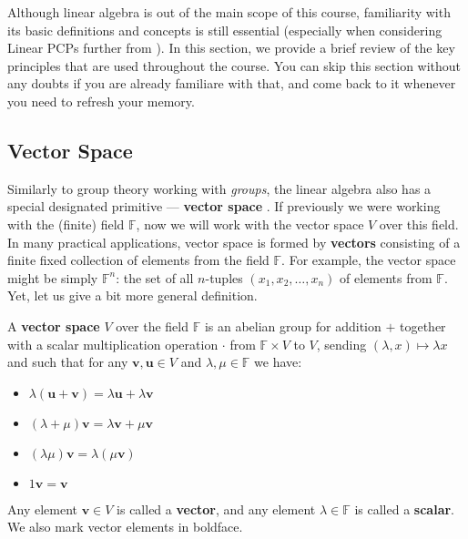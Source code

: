 \documentclass[../lecture-notes-148x210.tex]{subfiles}
\begin{document}
Although linear algebra is out of the main scope of this course, familiarity
with its basic definitions and concepts is still essential (especially when
considering Linear PCPs further from ). In this section, we
provide a brief review of the key principles that are used throughout the
course. You can skip this section without any doubts if you are already
familiare with that, and come back to it whenever you need to refresh your
memory.

\subsection{Vector Space}

Similarly to group theory working with \textit{groups}, the linear algebra also has a special designated primitive --- \textbf{vector space} \cite[section 20]{Judson_2012}. If previously we were working
with the (finite) field $\mathbb{F}$, now we will work with the vector space $V$ over this field. In many practical applications,
vector space is formed by \textbf{vectors} consisting of a finite fixed collection of elements from the field $\mathbb{F}$. For example,
the vector space might be simply $\mathbb{F}^n$: the set of all $n$-tuples $(x_1,x_2,\dots,x_n)$ of elements from $\mathbb{F}$. Yet, let us give a bit more general definition.

\begin{definition}
    A \textbf{vector space} $V$ over the field $\mathbb{F}$ is an abelian group for addition $+$ together with a scalar multiplication operation $\cdot$ from $\mathbb{F} \times V$ to $V$, sending $(\lambda,x) \mapsto \lambda x$ and such that for any $\mathbf{v},\mathbf{u} \in V$ and $\lambda,\mu \in \mathbb{F}$ we have:
    \begin{itemize}
        \item $\lambda(\mathbf{u}+\mathbf{v}) = \lambda \mathbf{u} + \lambda \mathbf{v}$
        \item $(\lambda + \mu)\mathbf{v} = \lambda \mathbf{v} + \mu \mathbf{v}$
        \item $(\lambda \mu)\mathbf{v} = \lambda(\mu \mathbf{v})$
        \item $1\mathbf{v} = \mathbf{v}$
    \end{itemize}

    Any element $\mathbf{v} \in V$ is called a \textbf{vector}, and any element $\lambda \in \mathbb{F}$ is called a \textbf{scalar}. We also mark vector elements in boldface.
\end{definition}
\end{document}
